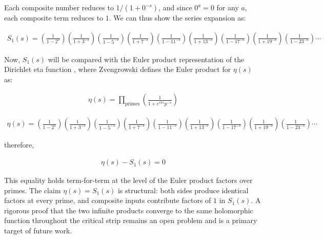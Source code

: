 \documentclass{article}
\begin{document}
Each composite number reduces to $1/(1+0^{-s})$, and since $0^a = 0$ for any $a$, each composite term reduces to $1$. We can thus show the series expansion as:

\begin{align*}
S_1(s) = (\tfrac{1}{1 - 2^{s}})(\tfrac{1}{1 + 3^{-s}})(\tfrac{1}{1 - 5^{-s}})(\tfrac{1}{1 + 7^{-s}})(\tfrac{1}{1 - 11^{-s}})(\tfrac{1}{1 + 13^{-s}})(\tfrac{1}{1 - 17^{-s}})(\tfrac{1}{1 + 19^{-s}})(\tfrac{1}{1 - 23^{-s}}) \cdots
\end{align*}

Now, $S_1(s)$ will be compared with the Euler product representation of the Dirichlet eta function \cite{zvengrowski2003convergence}, where Zvengrowski defines the Euler product for $\eta(s)$ as:

\begin{align*}
\eta(s) = \prod_{\text{primes}} \left( \frac{1}{1+e^{i\pi s}p^{-s}} \right)
\end{align*}

\begin{align*}
\eta(s) = (\tfrac{1}{1 - 2^{s}})(\tfrac{1}{1 + 3^{-s}})(\tfrac{1}{1 - 5^{-s}})(\tfrac{1}{1 + 7^{-s}})(\tfrac{1}{1 - 11^{-s}})(\tfrac{1}{1 + 13^{-s}})(\tfrac{1}{1 - 17^{-s}})(\tfrac{1}{1 + 19^{-s}})(\tfrac{1}{1 - 23^{-s}}) \cdots
\end{align*}

therefore,

\begin{align*}
\eta(s) - S_1(s) = 0
\end{align*}

This equality holds term-for-term at the level of the Euler product factors over primes. The claim $\eta(s) = S_1(s)$ is structural: both sides produce identical factors at every prime, and composite inputs contribute factors of $1$ in $S_1(s)$. A rigorous proof that the two infinite products converge to the same holomorphic function throughout the critical strip remains an open problem and is a primary target of future work.
\end{document}
